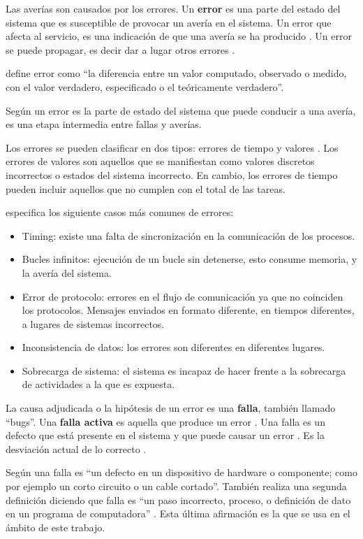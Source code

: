 Las averías son causados por los errores. Un \textbf{error} es una parte del estado del sistema
que es susceptible de provocar un avería en el sistema. Un error que afecta al servicio, es una
indicación de que una avería se ha producido \citep{Hanmer07}. Un error se puede propagar, es decir
dar a lugar otros errores \citep{Pullum01}.

\cite{IEEE610.12} define error como ``la diferencia entre un valor computado, observado o medido,
con el valor verdadero, especificado o el teóricamente verdadero''.

Según \cite{Rani11} un error es la parte de estado del sistema que puede conducir a una avería, es una
etapa intermedia entre fallas y averías.

Los errores se pueden clasificar en dos tipos: errores de tiempo y valores \citep{Hanmer07}. Los
errores de valores son aquellos que se manifiestan como valores discretos incorrectos o estados del
sistema incorrecto. En cambio, los errores de tiempo pueden incluir aquellos que no cumplen con el total de las tareas.

\cite{Hanmer07} especifica los siguiente casos más comunes de errores:
\begin{itemize}
 \item Timing: existe una falta de sincronización en la comunicación de los procesos.
 \item Bucles infinitos: ejecución de un bucle sin detenerse, esto consume memoria, y la
avería del sistema.
 \item Error de protocolo: errores en el flujo de comunicación ya que no coinciden los
protocolos. Mensajes enviados en formato diferente, en tiempos diferentes, a lugares de sistemas
incorrectos.
 \item Inconsistencia de datos: los errores son diferentes en diferentes lugares.
 \item Sobrecarga de sistema: el sistema es incapaz de hacer frente a la sobrecarga de
actividades a la que es expuesta.
\end{itemize}

La causa adjudicada o la hipótesis de un error es una \textbf{falla}, también llamado ``bugs''. Una
\textbf{falla activa} es aquella que produce un error \citep{Pullum01}. Una falla es un defecto que está
presente en el sistema y que puede causar un error \citep{Hanmer07}. Es la desviación actual de lo
correcto \citep{Hanmer07} \citep{Rani11}. 

Según \cite{IEEE610.12} una falla es ``un defecto en un dispositivo de hardware o componente; como
por ejemplo un corto circuito o un cable cortado''. También realiza una segunda definición diciendo
que falla es ``un paso incorrecto, proceso, o definición de dato en un programa de computadora''
\citep{IEEE610.12}. Esta última afirmación es la que se usa en el ámbito de este trabajo.

